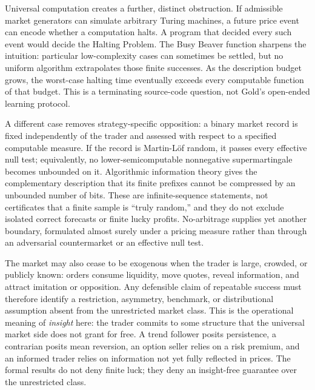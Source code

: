 \documentclass[aps,pra,reprint,superscriptaddress,amsmath,amssymb,floatfix]{revtex4-2}
\theoremstyle{plain}
\theoremstyle{definition}
\theoremstyle{remark}
\begin{document}
Universal computation creates a further, distinct obstruction. If admissible
market generators can simulate arbitrary Turing machines, a future price event
can encode whether a computation halts. A program that decided every such
event would decide the Halting Problem. The Busy Beaver function sharpens the
intuition: particular low-complexity cases can sometimes be settled, but no
uniform algorithm extrapolates those finite successes. As the description
budget grows, the worst-case halting time eventually exceeds every computable
function of that budget. This is a terminating source-code question, not
Gold's open-ended learning protocol.

A different case removes strategy-specific opposition: a binary market record
is fixed independently of the trader and assessed with respect to a specified
computable measure. If the record is Martin-L\"of random, it passes every
effective null test; equivalently, no lower-semicomputable nonnegative
supermartingale becomes unbounded on it. Algorithmic information theory gives
the complementary description that its finite prefixes cannot be compressed
by an unbounded number of bits. These are infinite-sequence statements, not
certificates that a finite sample is ``truly random,'' and they do not exclude
isolated correct forecasts or finite lucky profits. No-arbitrage supplies yet
another boundary, formulated almost surely under a pricing measure rather than
through an adversarial countermarket or an effective null test.

The market may also cease to be exogenous when the trader is large, crowded,
or publicly known: orders consume liquidity, move quotes, reveal information,
and attract imitation or opposition. Any defensible claim of repeatable
success must therefore identify a restriction, asymmetry, benchmark, or
distributional assumption absent from the unrestricted market class. This is
the operational meaning of \emph{insight} here: the trader commits to some
structure that the universal market side does not grant for free. A trend
follower posits persistence, a contrarian posits mean reversion, an option
seller relies on a risk premium, and an informed trader relies on information
not yet fully reflected in prices. The formal results do not deny finite luck;
they deny an insight-free guarantee over the unrestricted class.
\end{document}
